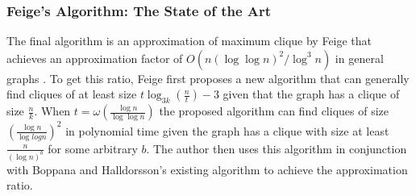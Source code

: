 \documentclass{article}
\theoremstyle{definition}
\begin{document}
\subsubsection{Feige's Algorithm: The State of the Art}

The final algorithm is an approximation of maximum clique by Feige that achieves an approximation factor of $O(n(\log{\log{n}})^2/\log^3{n})$ in general graphs \cite{FeigeApprox}. To get this ratio, Feige first proposes a new algorithm that can generally find cliques of at least size $t\log_{3k}(\frac{n}{t})-3$ given that the graph has a clique of size $\frac{n}{k}$. When $t = \omega(\frac{\log n}{\log \log n})$ the proposed algorithm can find cliques of size $(\frac{\log n}{\log{log n}})^2$ in polynomial time given the graph has a clique with size at least $\frac{n}{(\log{n})^b}$ for some arbitrary $b$. The author then uses this algorithm in conjunction with Boppana and Halldorsson's existing algorithm \cite{Boppana1992} to achieve the approximation ratio.
\end{document}
